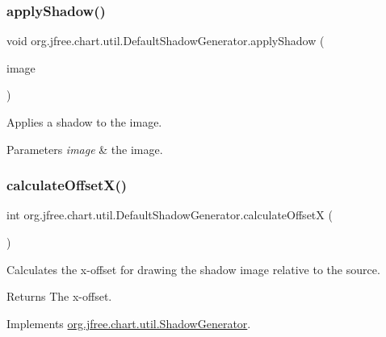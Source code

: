 \subsubsection{\texorpdfstring{apply\+Shadow()}{applyShadow()}}
{\footnotesize\ttfamily void org.\+jfree.\+chart.\+util.\+Default\+Shadow\+Generator.\+apply\+Shadow (\begin{DoxyParamCaption}\item[{Buffered\+Image}]{image }\end{DoxyParamCaption})\hspace{0.3cm}{\ttfamily [protected]}}

Applies a shadow to the image.


\begin{DoxyParams}{Parameters}
{\em image} & the image. \\
\hline
\end{DoxyParams}
\mbox{\label{classorg_1_1jfree_1_1chart_1_1util_1_1_default_shadow_generator_a30826c0062e4caa01d58438d4fd05733}} 
\subsubsection{\texorpdfstring{calculate\+Offset\+X()}{calculateOffsetX()}}
{\footnotesize\ttfamily int org.\+jfree.\+chart.\+util.\+Default\+Shadow\+Generator.\+calculate\+OffsetX (\begin{DoxyParamCaption}{ }\end{DoxyParamCaption})}

Calculates the x-\/offset for drawing the shadow image relative to the source.

\begin{DoxyReturn}{Returns}
The x-\/offset. 
\end{DoxyReturn}


Implements \mbox{\hyperlink{interfaceorg_1_1jfree_1_1chart_1_1util_1_1_shadow_generator_a8a4a3d5012c0aa1d45ddb68e390f7968}{org.\+jfree.\+chart.\+util.\+Shadow\+Generator}}.

\mbox{\label{classorg_1_1jfree_1_1chart_1_1util_1_1_default_shadow_generator_ae526cdf627474b32814f887b140609cf}} 
